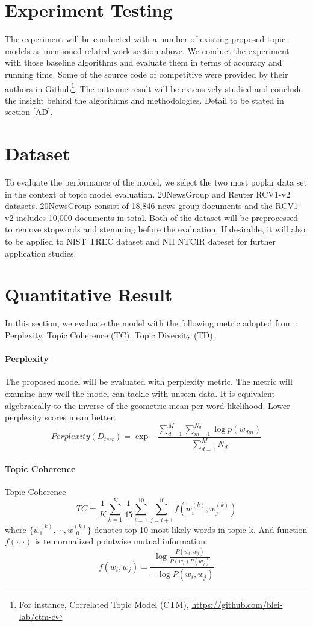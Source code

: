 \section{Experiment Testing}
The experiment will be conducted with a number of existing proposed topic models as mentioned related work section above. We conduct the experiment with those baseline algorithms and evaluate them in terms of accuracy and running time. Some of the source code of competitive were provided by their authors in Github\footnote[1]{For instance, Correlated Topic Model (CTM), \href{https://github.com/blei-lab/ctm-c}{https://github.com/blei-lab/ctm-c}}. The outcome result will be extensively studied and conclude the insight behind the algorithms and methodologies. Detail to be stated in section \ref{AD}.
\section{Dataset}To evaluate the performance of the model, we select the two most poplar data set in the context of topic model evaluation. 20NewsGroup and Reuter RCV1-v2 datasets. 20NewsGroup consist of 18,846 news group documents and the RCV1-v2 includes 10,000 documents in total. Both of the dataset will be preprocessed to remove stopwords and stemming before the evaluation. If desirable, it will also to be applied to NIST TREC dataset and NII NTCIR dateset for further application studies.
\section{Quantitative Result}
In this section, we evaluate the model with the following metric adopted from \cite{dieng_dynamic_2019}: Perplexity, Topic Coherence (TC), Topic Diversity (TD). %
\paragraph{Perplexity}The proposed model will be evaluated with perplexity metric. The metric will examine how well the model can tackle with unseen data. It is equivalent algebraically to the inverse of the geometric mean per-word likelihood. Lower perplexity scores mean better.\begin{equation*}
Perplexity(D_{test})=\exp{{-\frac{\sum_{d=1}^{M}\sum_{m=1}^{N_d}\log p(w_{dm})}{\sum_{d=1}^{M}N_d}}}
\end{equation*}
\paragraph{Topic Coherence}Topic Coherence \cite{mimno_optimizing_2011}
\begin{equation*}
TC=\frac{1}{K}\sum_{k=1}^{K}\frac{1}{45}\sum_{i=1}^{10}\sum_{j=i+1}^{10}f(w_i^{(k)},w_j^{(k)})\end{equation*}
where $\{w_1^{(k)},\cdots,w_{10}^{(k)}\}$ denotes top-10 most likely words in topic k. And function $f(\cdot,\cdot)$ is te normalized pointwise mutual information.\begin{equation*}
f(w_i,w_j)=\frac{\log\frac{P(w_i,w_j)}{P(w_i)P(w_j)}}{-\log P(w_i,w_j)}\end{equation*}
